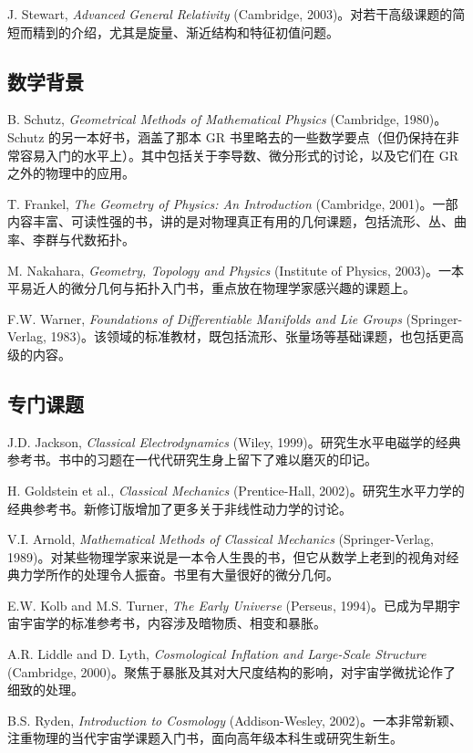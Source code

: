 J. Stewart, \emph{Advanced General Relativity} (Cambridge, 2003)。对若干高级课题的简短而精到的介绍，尤其是旋量、渐近结构和特征初值问题。

\subsection*{数学背景}

B. Schutz, \emph{Geometrical Methods of Mathematical Physics} (Cambridge, 1980)。Schutz 的另一本好书，涵盖了那本 GR 书里略去的一些数学要点（但仍保持在非常容易入门的水平上）。其中包括关于李导数、微分形式的讨论，以及它们在 GR 之外的物理中的应用。

T. Frankel, \emph{The Geometry of Physics: An Introduction} (Cambridge, 2001)。一部内容丰富、可读性强的书，讲的是对物理真正有用的几何课题，包括流形、丛、曲率、李群与代数拓扑。

M. Nakahara, \emph{Geometry, Topology and Physics} (Institute of Physics, 2003)。一本平易近人的微分几何与拓扑入门书，重点放在物理学家感兴趣的课题上。

F.W. Warner, \emph{Foundations of Differentiable Manifolds and Lie Groups} (Springer-Verlag, 1983)。该领域的标准教材，既包括流形、张量场等基础课题，也包括更高级的内容。

\subsection*{专门课题}

J.D. Jackson, \emph{Classical Electrodynamics} (Wiley, 1999)。研究生水平电磁学的经典参考书。书中的习题在一代代研究生身上留下了难以磨灭的印记。

H. Goldstein et al., \emph{Classical Mechanics} (Prentice-Hall, 2002)。研究生水平力学的经典参考书。新修订版增加了更多关于非线性动力学的讨论。

V.I. Arnold, \emph{Mathematical Methods of Classical Mechanics} (Springer-Verlag, 1989)。对某些物理学家来说是一本令人生畏的书，但它从数学上老到的视角对经典力学所作的处理令人振奋。书里有大量很好的微分几何。

E.W. Kolb and M.S. Turner, \emph{The Early Universe} (Perseus, 1994)。已成为早期宇宙宇宙学的标准参考书，内容涉及暗物质、相变和暴胀。

A.R. Liddle and D. Lyth, \emph{Cosmological Inflation and Large-Scale Structure} (Cambridge, 2000)。聚焦于暴胀及其对大尺度结构的影响，对宇宙学微扰论作了细致的处理。

B.S. Ryden, \emph{Introduction to Cosmology} (Addison-Wesley, 2002)。一本非常新颖、注重物理的当代宇宙学课题入门书，面向高年级本科生或研究生新生。

